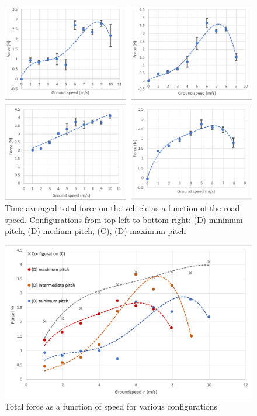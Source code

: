 \begin{figure}[!htbp]
    \centering
    \includegraphics[width = \linewidth]{images/part11/individualresults.png}
    \caption{Time averaged total force on the vehicle as a function of the road speed. Configurations from top left to bottom right: (D) minimum pitch, (D) medium pitch, (C), (D) maximum pitch}
    \label{fig:individualresults}
\end{figure}

\begin{figure}[!htbp]
    \centering
    \includegraphics[width = 0.9\linewidth]{images/part11/synthesis.png}
    \caption{Total force as a function of speed for various configurations}
    \label{fig:synthesis}
\end{figure}



